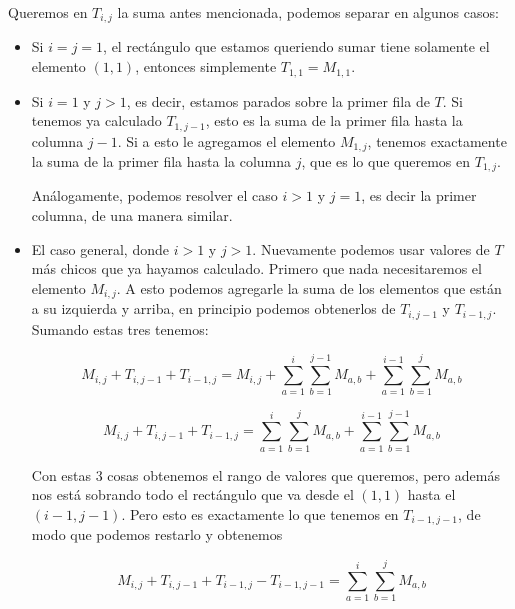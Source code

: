 Queremos en $T_{i,j}$ la suma antes mencionada, podemos separar en algunos casos: 
\begin{itemize}
\item Si $i = j = 1$, el rectángulo que estamos queriendo sumar tiene solamente el 
elemento $(1,1)$, entonces simplemente $T_{1,1} = M_{1,1}$. 

\item Si $i = 1$ y $j > 1$, es decir, estamos parados sobre la primer fila de $T$. 
Si tenemos ya calculado $T_{1,j-1}$, esto es la suma de la primer fila hasta la 
columna $j-1$. Si a esto le agregamos el elemento $M_{1,j}$, tenemos exactamente la 
suma de la primer fila hasta la columna $j$, que es lo que queremos en $T_{1,j}$. 

Análogamente, podemos resolver el caso $i > 1$ y $j = 1$, es decir la primer columna, 
de una manera similar. 

\item El caso general, donde $i > 1$ y $j > 1$. Nuevamente podemos usar valores de $T$ más 
chicos que ya hayamos calculado. Primero que nada necesitaremos el elemento $M_{i,j}$. 
A esto podemos agregarle la suma de los elementos que están a su izquierda y arriba, 
en principio podemos obtenerlos de $T_{i,j-1}$ y $T_{i-1,j}$. Sumando estas tres tenemos: 

\begin{equation}
M_{i,j} + T_{i,j-1} + T_{i-1,j} = M_{i,j} + \sum\limits_{a = 1}^{i} \sum\limits_{b = 1}^{j-1} M_{a,b} + \sum\limits_{a = 1}^{i-1} \sum\limits_{b = 1}^{j} M_{a,b}
\end{equation}


\begin{equation}
M_{i,j} + T_{i,j-1} + T_{i-1,j} = \sum\limits_{a = 1}^{i} \sum\limits_{b = 1}^{j} M_{a,b} + \sum\limits_{a = 1}^{i-1} \sum\limits_{b = 1}^{j-1} M_{a,b}
\end{equation}

Con estas 3 cosas obtenemos el rango de valores que queremos, pero además nos está sobrando 
todo el rectángulo que va desde el $(1,1)$ hasta el $(i-1,j-1)$. Pero esto es exactamente lo 
que tenemos en $T_{i-1,j-1}$, de modo que podemos restarlo y obtenemos 

\begin{equation}
M_{i,j} + T_{i,j-1} + T_{i-1,j} - T_{i-1,j-1} = \sum\limits_{a = 1}^{i} \sum\limits_{b = 1}^{j} M_{a,b}
\end{equation}

\end{itemize}

